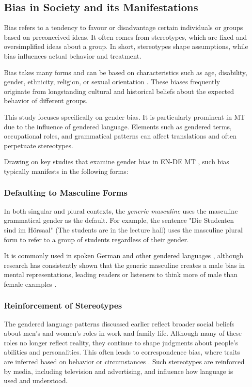 \subsection{Bias in Society and its Manifestations}
\label{subsection:manifestations_of_gb}
    Bias refers to a tendency to favour or disadvantage certain individuals or groups based on preconceived ideas. It often comes from stereotypes, which are fixed and oversimplified ideas about a group. In short, stereotypes shape assumptions, while bias influences actual behavior and treatment.

    Bias takes many forms and can be based on characteristics such as age, disability, gender, ethnicity, religion, or sexual orientation \parencite{ullmannGenderBiasMachine2022}. These biases frequently originate from longstanding cultural and historical beliefs about the expected behavior of different groups.

    This study focuses specifically on gender bias. It is particularly prominent in MT due to the influence of gendered language. Elements such as gendered terms, occupational roles, and grammatical patterns can affect translations and often perpetuate stereotypes.
    
    Drawing on key studies that examine gender bias in EN-DE MT \parencite{ullmannGenderBiasMachine2022,rescignoGenderBiasMachine2023,lardelliBuildingBridgesDataset2024,kapplAreAllSpanish2025}, such bias typically manifests in the following forms:

    \subsubsection{Defaulting to Masculine Forms}
        In both singular and plural contexts, the \textit{generic masculine} uses the masculine grammatical gender as the default.
        For example, the sentence "Die Studenten sind im Hörsaal" (The students are in the lecture hall) uses the masculine plural form to refer to a group of students regardless of their gender.

        It is commonly used in spoken German and other gendered languages \parencite{lardelliBuildingBridgesDataset2024,schmitzGermanAllProfessors2022}, although research has consistently shown that the generic masculine creates a male bias in mental representations, leading readers or listeners to think more of male than female examples \parencite{sczesnyCanGenderFairLanguage2016}. 

    \subsubsection{Reinforcement of Stereotypes}
        The gendered language patterns discussed earlier reflect broader social beliefs about men’s and women’s roles in work and family life. Although many of these roles no longer reflect reality, they continue to shape judgments about people’s abilities and personalities. This often leads to correspondence bias, where traits are inferred based on behavior or circumstances \parencite{godsilEffectsGenderRoles2016}. Such stereotypes are reinforced by media, including television and advertising, and influence how language is used and understood.

